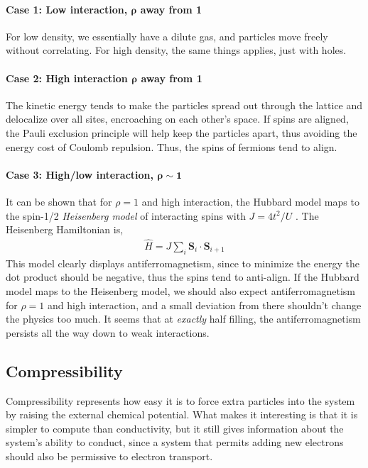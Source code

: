\documentclass{article}
\begin{document}
\paragraph{Case 1: Low interaction, $\bm{\rho}$ away from 1} For low density, we essentially have a dilute gas, and particles move freely without correlating. For high density, the same things applies, just with holes.

\paragraph{Case 2: High interaction $\bm{\rho}$ away from 1} The kinetic energy tends to make the particles spread out through the lattice and delocalize over all sites, encroaching on each other's space. If spins are aligned, the Pauli exclusion principle will help keep the particles apart, thus avoiding the energy cost of Coulomb repulsion. Thus, the spins of fermions tend to align.

\paragraph{Case 3: High/low interaction, $\bm{\rho \sim 1}$} It can be shown that for $\rho = 1$ and high interaction, the Hubbard model maps to the spin-1/2 \textit{Heisenberg model} of interacting spins with $J = 4t^2/U$ \cite{scalettar}. The Heisenberg Hamiltonian is,
\begin{align*}
\hat H = J\sum_i \bm S_i \cdot \bm S_{i+1}
\end{align*}
This model clearly displays antiferromagnetism, since to minimize the energy the dot product should be negative, thus the spins tend to anti-align. If the Hubbard model maps to the Heisenberg model, we should also expect antiferromagnetism for $\rho = 1$ and high interaction, and a small deviation from there shouldn't change the physics too much. It seems that at \textit{exactly} half filling, the antiferromagnetism persists all the way down to weak interactions.

\subsection{Compressibility}
Compressibility represents how easy it is to force extra particles into the system by raising the external chemical potential. What makes it interesting is that it is simpler to compute than conductivity, but it still gives information about the system's ability to conduct, since a system that permits adding new electrons should also be permissive to electron transport.
\end{document}
